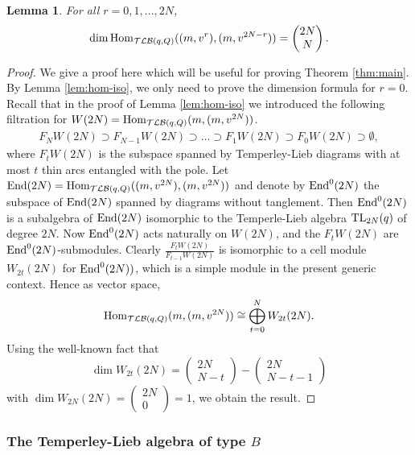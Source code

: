 \documentclass[12pt]{amsart}
\newtheorem{lemma}[theorem]{Lemma}
\theoremstyle{definition}
\theoremstyle{remark}
\numberwithin{equation}{section}
\newcommand{\End}{{\rm{End}}}
\newcommand{\Hom}{{\rm{Hom}}}
\newcommand{\TL}{{\rm{TL}}}
\newcommand{\tl}{Temperley-Lieb }
\newcommand{\TLBC}{\mathcal{TLB}}
\begin{document}
\begin{lemma} \label{lem:dim-TLB} For all $r=0, 1, \dots, 2N$, 
\[
\dim\Hom_{\TLBC(q, Q)}((m, v^r), (m, v^{2N-r}))=\begin{pmatrix}2N\\ N\end{pmatrix}.
\]
\end{lemma}
\begin{proof}  We give a proof here which will be useful for proving Theorem \ref{thm:main}. 
By Lemma \ref{lem:hom-iso}, we only need to prove the dimension formula for $r=0$. 
Recall that in the proof of Lemma \ref{lem:hom-iso} we introduced the following filtration for $W(2N)=\Hom_{\TLBC(q, Q)}(m, (m, v^{2N}))$.
\begin{eqnarray}\label{eq:filtr}
F_NW(2N)\supset F_{N-1}W(2N)\supset \dots\supset F_1W(2N)\supset F_0W(2N)\supset\emptyset,
\end{eqnarray}
where $F_tW(2N)$ is the subspace spanned by \tl diagrams with at most $t$ thin arcs entangled with the pole.
Let $\End(2N)= \Hom_{\TLBC(q, Q)}((m, v^{2N}), (m, v^{2N}))$ and denote by $\End^0(2N)$ the subspace of 
$\End(2N)$ spanned by diagrams without tanglement.  Then $\End^0(2N)$ is a subalgebra of  
$\End(2N)$ isomorphic to the Temperle-Lieb algebra $\TL_{2N}(q)$ of degree $2N$. Now $\End^0(2N)$  
 acts naturally on $W(2N)$, and the $F_tW(2N)$ are 
$\End^0(2N)$-submodules. Clearly $\frac{F_tW(2N)}{F_{t-1}W(2N)}$ is isomorphic to a cell module 
$W_{2t}(2N)$ \cite[Def.(2.2)] {GL98} for $\End^0(2N))$, which is a simple module in the present generic context. 
 Hence as vector space, 
\begin{eqnarray}
\Hom_{\TLBC(q, Q)}(m, (m, v^{2N})) \cong \bigoplus_{t=0}^N W_{2t}(2N).
\end{eqnarray}
Using  the well-known fact \cite{ILZ1} that 
\[
\dim W_{2t}(2N)=\begin{pmatrix}2N\\ N-t\end{pmatrix} - \begin{pmatrix}2N\\ N-t-1\end{pmatrix}  
\]
with $\dim W_{2N}(2N)=\begin{pmatrix}2N\\ 0\end{pmatrix} =1$, 
we obtain the result. 
\end{proof}

%
%
\subsubsection{The Temperley-Lieb algebra of type $B$}
%
%
\end{document}
